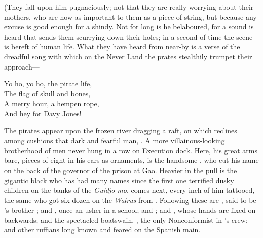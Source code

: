 \begin{stagedir}
(They fall upon him pugnaciously;
not that they are really worrying about their mothers, who are now as important to them as a piece of string,
but because any excuse is good enough for a shindy.
Not for long is he belaboured, for a sound is heard that sends them scurrying down their holes; in a second of time the scene is bereft of human life.
What they have heard from near-by is a verse of the dreadful song with which on the Never Land the prates stealthily trumpet their approach—

\begin{drama}
\speakercontinues
	Yo ho, yo ho, the pirate life,\\
	The flag of skull and bones,\\
	A merry hour, a hempen rope,\\
	And hey for Davy Jones!
\end{drama}

The pirates appear upon the frozen river dragging a raft,
on which reclines among cushions that dark and fearful man, .
A more villainous-looking brotherhood of men never hung in a row on Execution dock.
Here, his great arms bare, pieces of eight in his ears as ornaments, is the handsome \cecco, who cut his name on the back of the governor of the prison at Gao.
Heavier in the pull is the gigantic black who has had many names since the first one terrified dusky children on the banks of the \emph{Guidjo-mo}.
 comes next, every inch of him tattooed, the same \jukes who got six dozen on the \emph{Walrus} from .
Following these are \cookson, said to be ’s brother ;
and , once an usher in a school;
and  ;
and \noodler, whose hands are fixed on backwards;
and the spectacled boatswain, \smee, the only Nonconformist in \hook’s crew;
and other ruffians long known and feared on the Spanish main.


\end{stagedir}
